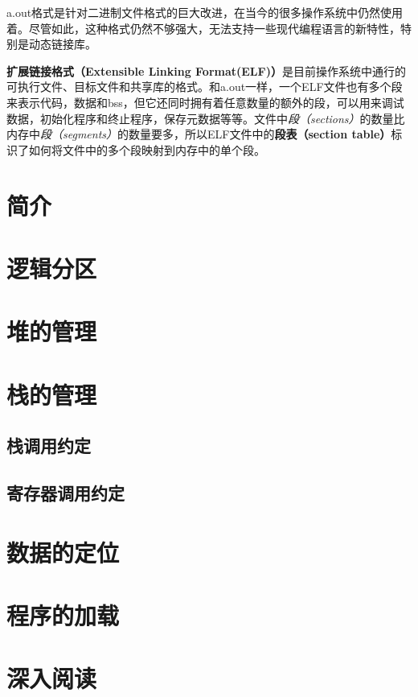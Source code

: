 \documentclass[cn,11pt,chinese]{elegantbook}
\begin{document}
a.out格式是针对二进制文件格式的巨大改进，在当今的很多操作系统中仍然使用着。尽管如此，这种格式仍然不够强大，无法支持一些现代编程语言的新特性，特别是动态链接库。

\textbf{扩展链接格式（Extensible Linking Format(ELF)）}是目前操作系统中通行的可执行文件、目标文件和共享库的格式。和a.out一样，一个ELF文件也有多个段来表示代码，数据和bss，但它还同时拥有着任意数量的额外的段，可以用来调试数据，初始化程序和终止程序，保存元数据等等。文件中\textit{段（sections）}的数量比内存中\textit{段（segments）}的数量要多，所以ELF文件中的\textbf{段表（section table）}标识了如何将文件中的多个段映射到内存中的单个段。

\section{简介}

\section{逻辑分区}

\section{堆的管理}

\section{栈的管理}

\subsection{栈调用约定}

\subsection{寄存器调用约定}

\section{数据的定位}

\section{程序的加载}

\section{深入阅读}
\end{document}

